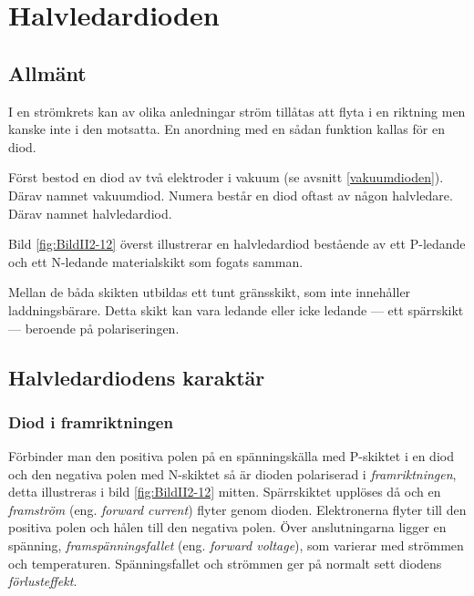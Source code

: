 \section{Halvledardioden}

\subsection{Allmänt}
\label{dioden_allmänt}

I en strömkrets kan av olika anledningar ström tillåtas att flyta i en riktning
men kanske inte i den motsatta. En anordning med en sådan funktion kallas för
en diod.

Först bestod en diod av två elektroder i vakuum (se avsnitt
\ref{vakuumdioden}). Därav namnet vakuumdiod.
Numera består en diod oftast av någon halvledare. Därav namnet halvledardiod.


Bild \ref{fig:BildII2-12} överst illustrerar en halvledardiod bestående av ett
P-ledande och ett N-ledande materialskikt som fogats samman.

Mellan de båda skikten utbildas ett tunt gränsskikt, som inte innehåller
laddningsbärare. Detta skikt kan vara ledande eller icke ledande --- ett
spärrskikt --- beroende på polariseringen.

\subsection{Halvledardiodens karaktär}

\subsubsection{Diod i framriktningen}

Förbinder man den positiva polen på en spänningskälla med P-skiktet i en diod
och den negativa polen med N-skiktet så är dioden polariserad i
\emph{framriktningen}, detta illustreras i bild \ref{fig:BildII2-12} mitten.
Spärrskiktet upplöses då och en \emph{framström}
(eng. \emph{forward current}) flyter genom dioden.
Elektronerna flyter till den positiva polen och hålen till den negativa polen.
Över anslutningarna ligger en spänning, \emph{framspänningsfallet}
(eng. \emph{forward voltage}), som varierar med strömmen och temperaturen.
Spänningsfallet och strömmen ger på normalt sett diodens \emph{förlusteffekt}.

